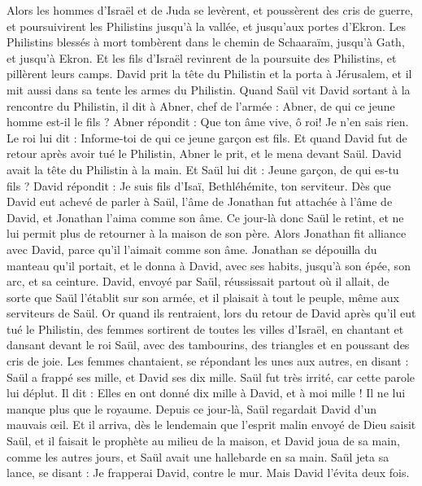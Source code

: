 \begin{multicols}{2}
Alors les hommes d'Israël et de Juda se levèrent, et poussèrent des cris de guerre, et poursuivirent les Philistins jusqu'à la vallée, et jusqu'aux portes d'Ekron. Les Philistins blessés à mort tombèrent dans le chemin de Schaaraïm, jusqu'à Gath, et jusqu'à Ekron.
Et les fils d'Israël revinrent de la poursuite des Philistins, et pillèrent leurs camps.
David prit la tête du Philistin et la porta à Jérusalem, et il mit aussi dans sa tente les armes du Philistin.
Quand Saül vit David sortant à la rencontre du Philistin, il dit à Abner, chef de l'armée : Abner, de qui ce jeune homme est-il le fils ? Abner répondit : Que ton âme vive, ô roi! Je n'en sais rien.
Le roi lui dit : Informe-toi de qui ce jeune garçon est fils.
Et quand David fut de retour après avoir tué le Philistin, Abner le prit, et le mena devant Saül. David avait la tête du Philistin à la main.
Et Saül lui dit : Jeune garçon, de qui es-tu fils ? David répondit : Je suis fils d'Isaï, Bethléhémite, ton serviteur.
\VerseOne{}Dès que David eut achevé de parler à Saül, l'âme de Jonathan fut attachée à l'âme de David, et Jonathan l'aima comme son âme.
Ce jour-là donc Saül le retint, et ne lui permit plus de retourner à la maison de son père.
Alors Jonathan fit alliance avec David, parce qu'il l'aimait comme son âme.
Jonathan se dépouilla du manteau qu'il portait, et le donna à David, avec ses habits, jusqu'à son épée, son arc, et sa ceinture.
David, envoyé par Saül, réussissait partout où il allait, de sorte que Saül l'établit sur son armée, et il plaisait à tout le peuple, même aux serviteurs de Saül.
Or quand ils rentraient, lors du retour de David après qu'il eut tué le Philistin, des femmes sortirent de toutes les villes d'Israël, en chantant et dansant devant le roi Saül, avec des tambourins, des triangles et en poussant des cris de joie.
Les femmes chantaient, se répondant les unes aux autres, en disant : Saül a frappé ses mille, et David ses dix mille.
Saül fut très irrité, car cette parole lui déplut. Il dit : Elles en ont donné dix mille à David, et à moi mille ! Il ne lui manque plus que le royaume.
Depuis ce jour-là, Saül regardait David d'un mauvais œil.
Et il arriva, dès le lendemain que l'esprit malin envoyé de Dieu saisit Saül, et il faisait le prophète au milieu de la maison, et David joua de sa main, comme les autres jours, et Saül avait une hallebarde en sa main. 
Saül jeta sa lance, se disant : Je frapperai David, contre le mur. Mais David l'évita deux fois.

\end{multicols}
